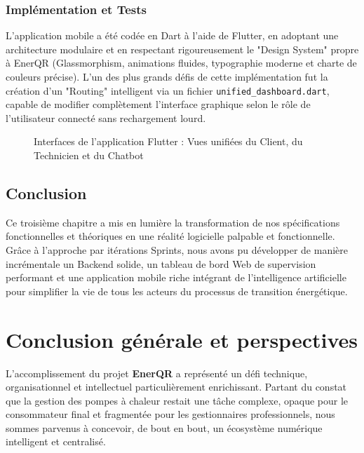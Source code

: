 \documentclass[12pt,a4paper]{report}
\begin{document}
\subsection{Implémentation et Tests}
L'application mobile a été codée en Dart à l'aide de Flutter, en adoptant une architecture modulaire et en respectant rigoureusement le "Design System" propre à EnerQR (Glassmorphism, animations fluides, typographie moderne et charte de couleurs précise). L'un des plus grands défis de cette implémentation fut la création d'un "Routing" intelligent via un fichier \texttt{unified\_dashboard.dart}, capable de modifier complètement l'interface graphique selon le rôle de l'utilisateur connecté sans rechargement lourd.

\begin{figure}[H]
    \centering
    \vspace{6cm} %
    \caption{Interfaces de l'application Flutter : Vues unifiées du Client, du Technicien et du Chatbot}
    \label{fig:ui_mobile}
\end{figure}

\section*{Conclusion}
Ce troisième chapitre a mis en lumière la transformation de nos spécifications fonctionnelles et théoriques en une réalité logicielle palpable et fonctionnelle. Grâce à l'approche par itérations Sprints, nous avons pu développer de manière incrémentale un Backend solide, un tableau de bord Web de supervision performant et une application mobile riche intégrant de l'intelligence artificielle pour simplifier la vie de tous les acteurs du processus de transition énergétique.

\chapter*{Conclusion générale et perspectives}

L'accomplissement du projet \textbf{EnerQR} a représenté un défi technique, organisationnel et intellectuel particulièrement enrichissant. Partant du constat que la gestion des pompes à chaleur restait une tâche complexe, opaque pour le consommateur final et fragmentée pour les gestionnaires professionnels, nous sommes parvenus à concevoir, de bout en bout, un écosystème numérique intelligent et centralisé.
\end{document}
